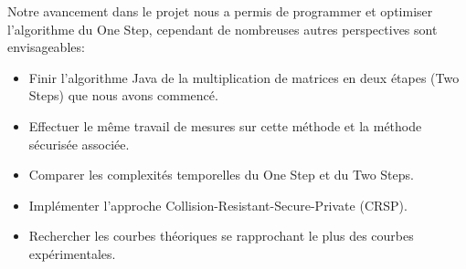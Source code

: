 Notre avancement dans le projet nous a permis de programmer et optimiser l'algorithme du One Step, cependant de nombreuses autres perspectives sont envisageables:
\begin{itemize}
\item Finir l'algorithme Java de la multiplication de matrices en deux étapes (Two Steps) que nous avons commencé.
\item Effectuer le même travail de mesures sur cette méthode et la méthode sécurisée associée.
\item Comparer les complexités temporelles du One Step et du Two Steps.
\item Implémenter l'approche Collision-Resistant-Secure-Private (CRSP).
\item Rechercher les courbes théoriques se rapprochant le plus des courbes expérimentales.
\end{itemize}